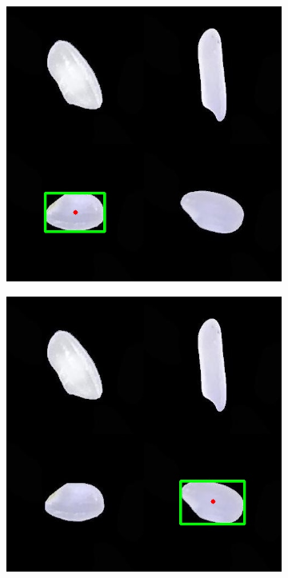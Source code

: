 \documentclass{article}
\begin{document}
\begin{figure} [!htb]
\begin{subfigure}[b]{0.2\textwidth}
        \caption{}
	\end{subfigure}
	\begin{subfigure}[b]{0.2\textwidth}
		\includegraphics[width= \textwidth]{fg/ccl_bbox_centroid_4.jpg}
        \caption{}
	\end{subfigure}
    \begin{subfigure}[b]{0.2\textwidth}
		\includegraphics[width= \textwidth]{fg/ccl_bbox_centroid_3.jpg}

\end{subfigure}
\end{figure}
\end{document}
